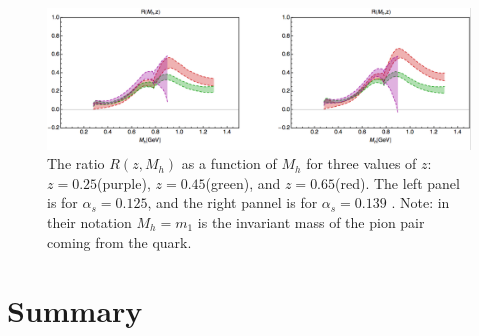 \documentclass[abstract = on,listof=totoc, bibliography=totoc]{scrreprt}
\begin{document}
 \begin{figure}
\begin{center}
\includegraphics[width = .8\textwidth]{extractionIFF2}
\caption[Extraction of IFF from Belle data]{The ratio $R(z,M_h)$ as a function of $M_h$ for three values of $z$: $z = 0.25$(purple), $z=0.45$(green), and $z=0.65$(red). The left panel is for $\alpha_s = 0.125$, and the right pannel is for $\alpha_s = 0.139$ \cite{RealEstValTrans}. Note: in their notation $M_h = m_1$ is the invariant mass of the pion pair coming from the quark.}
\label{fig:extractionIFF}
\end{center}
\end{figure}




\section{Summary}
\end{document}
